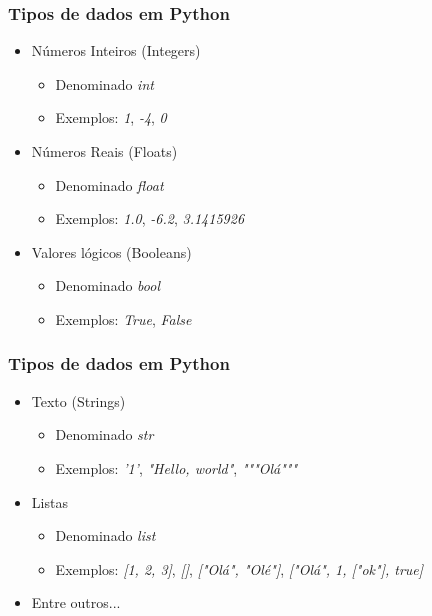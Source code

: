\documentclass{beamer}
\begin{document}
\begin{frame}
    \frametitle{Tipos de dados em Python}
    \begin{itemize}
        \item Números Inteiros (Integers)
            \begin{itemize}
                \item Denominado \textit{int}
                \item Exemplos: \textit{1}, \textit{-4}, \textit{0}
            \end{itemize}
        \item Números Reais (Floats)
            \begin{itemize}
                \item Denominado \textit{float}
                \item Exemplos: \textit{1.0}, \textit{-6.2}, \textit{3.1415926}
            \end{itemize}
        \item Valores lógicos (Booleans)
        \begin{itemize}
            \item Denominado \textit{bool}
            \item Exemplos: \textit{True}, \textit{False}
        \end{itemize}
    \end{itemize}
\end{frame}

\begin{frame}
    \frametitle{Tipos de dados em Python}
    \begin{itemize}
        \item Texto (Strings)
        \begin{itemize}
            \item Denominado \textit{str}
            \item Exemplos: \textit{'1'}, \textit{"Hello, world"}, \textit{"""Olá"""}
        \end{itemize}
    \item Listas
        \begin{itemize}
            \item Denominado \textit{list}
            \item Exemplos: \textit{[1, 2, 3]}, \textit{[]}, \textit{["Olá", "Olé"]}, \textit{["Olá", 1, ["ok"], true]}
        \end{itemize}
    \item Entre outros...
    \end{itemize}
\end{frame}
\end{document}
